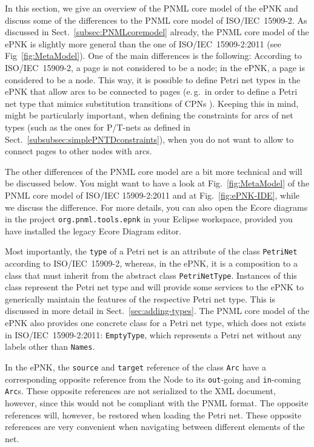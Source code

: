 In this section, we give an overview of the PNML core model of the
ePNK and discuss some of the differences to the PNML core model
of ISO/IEC~15909-2. As discussed in Sect.~\ref{subsec:PNMLcoremodel} already,
the PNML core model of the ePNK is slightly more general than the one of
ISO/IEC~15909-2:2011 \cite{ISO-IEC:15909-2-2011} (see Fig~\ref{fig:MetaModel}).
One of the main differences is the following: According to ISO/IEC~15909-2,
a page is not considered to be a node; in the ePNK, a page is considered to be
a node. This way, it is possible to define Petri net types in the ePNK that
allow arcs to be connected to pages (e.\,g.\ in order to define a Petri net
type that mimics substitution transitions of CPNs \cite{JeKr09}). Keeping
this in mind, might be particularly important, when defining the
constraints for arcs of net types (such as the ones for P/T-nets as
defined in Sect.~\ref{subsubsec:simplePNTDconstraints}), when you do
not want to allow to connect pages to other nodes with arcs.

The other differences of the PNML core model are a bit more technical
and will be discussed below. You might want to have a look at
Fig.~\ref{fig:MetaModel} of the PNML core model of ISO/IEC 15909-2:2011 
and at Fig.~\ref{fig:ePNK-IDE}, while we discuss the difference. For
more details, you can also open the Ecore diagrams in the project
{\tt org.pnml.tools.epnk} in your Eclipse workspace, provided you
have installed the legacy Ecore Diagram editor.

Most importantly, the {\tt type} of a Petri net is an attribute
of the class {\tt PetriNet} according to ISO/IEC~15909-2, whereas, in the
ePNK, it is a composition to a class that must inherit from the abstract class
{\tt PetriNetType}.%
Instances of this class represent the Petri net type and will provide some
services to the ePNK to generically maintain the features of the respective
Petri net type. This is discussed in more detail in
Sect.~\ref{sec:adding-types}.
The PNML core model of the ePNK also provides one concrete class for a Petri net
type, which does not exists in ISO/IEC~15909-2:2011: {\tt EmptyType},%
which represents a Petri net without any labels other than {\tt Names}.

In the ePNK, the {\tt source} and {\tt target} reference of the class
{\tt Arc} have a corresponding opposite reference from the {\sf Node} to its
{\tt out}-going and {\tt in}-coming {\tt Arc}s. These opposite references
are not serialized to the XML document, however, since this would not be
compliant with the PNML format. The opposite references will, however,
be restored when loading the Petri net. These opposite references are very
convenient when navigating between different elements of the net.


